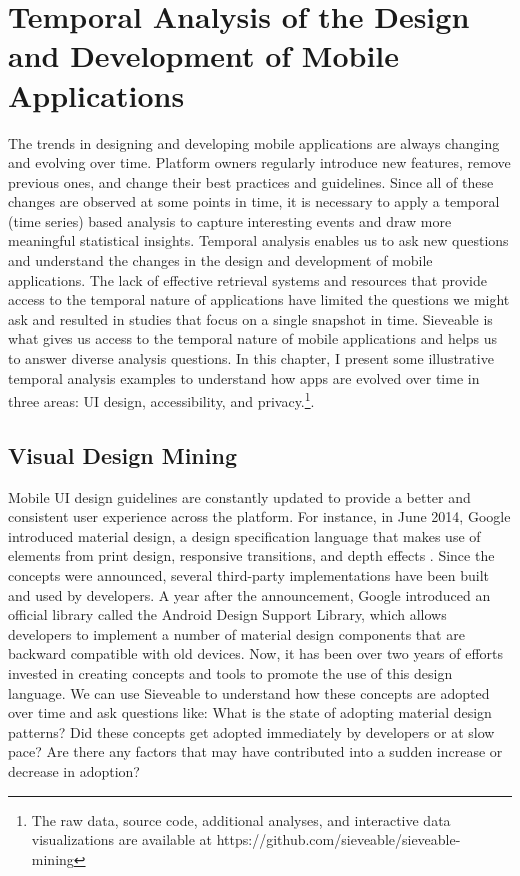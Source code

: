 \chapter{Temporal Analysis of the Design and Development of Mobile Applications}
\label{ch:findings_chapter}
The trends in designing and developing mobile applications are always changing and evolving over time.
Platform owners regularly introduce new features, remove previous ones, and change their best practices and guidelines.
Since all of these changes are observed at some points in time, it is necessary to apply a temporal (time series) based analysis to capture interesting events and draw more meaningful statistical insights.
Temporal analysis enables us to ask new questions and understand the changes in the design and development of mobile applications.
The lack of effective retrieval systems and resources that provide access to the temporal nature of applications have limited the questions we might ask and resulted in studies that focus on a single snapshot in time.
Sieveable is what gives us access to the temporal nature of mobile applications and helps us to answer diverse analysis questions.
In this chapter, I present some illustrative temporal analysis examples to understand how apps are evolved over time in three areas: UI design, accessibility, and privacy.\footnote{The raw data, source code, additional analyses, and interactive data visualizations are available at https://github.com/sieveable/sieveable-mining}.

\section{Visual Design Mining}

Mobile UI design guidelines are constantly updated to provide a better and consistent user experience across the platform.
For instance, in June 2014, Google introduced material design, a design specification language that makes use of elements from print design, responsive transitions, and depth effects \cite{Google_Material_Design}.
Since the concepts were announced, several third-party implementations have been built and used by developers.
A year after the announcement, Google introduced an official library called the Android Design Support Library, which allows developers to implement a number of material design components that are backward compatible with old devices.
Now, it has been over two years of efforts invested in creating concepts and tools to promote the use of this design language.
We can use Sieveable to understand how these concepts are adopted over time and ask questions like:
What is the state of adopting material design patterns?
Did these concepts get adopted immediately by developers or at slow pace?
Are there any factors that may have contributed into a sudden increase or decrease in adoption?

